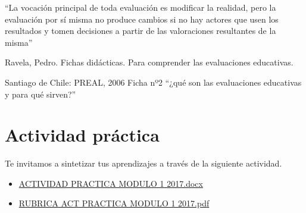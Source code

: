 \documentclass[12pt,letterpaper,article,x11names]{memoir}
\begin{document}
“La vocación principal de toda evaluación es modificar la realidad, pero la evaluación por sí misma no produce cambios si no hay actores que usen los resultados y tomen decisiones a partir de las valoraciones resultantes de la misma”


Ravela, Pedro. Fichas didácticas. Para comprender las evaluaciones educativas.

Santiago de Chile: PREAL, 2006 Ficha nº2 “¿qué son las evaluaciones educativas y para qué sirven?”

\section{Actividad práctica}
\label{sec:orga442fb9}
Te invitamos a sintetizar tus aprendizajes a través de la siguiente actividad.

\begin{itemize}
\item \href{https://db.tt/k3LTxgylOW}{ACTIVIDAD PRACTICA MODULO 1 2017.docx}
\item \href{https://db.tt/sifGHXxD2u}{RUBRICA ACT PRACTICA MODULO 1 2017.pdf}
\end{itemize}
\end{document}
